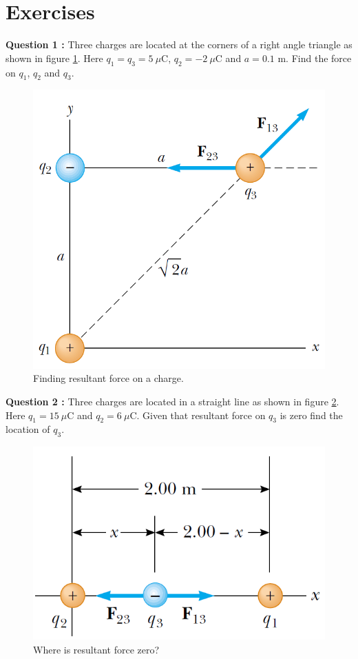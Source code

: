 \documentclass[12pt,a4paper]{article}
\begin{document}
\section{Exercises}
\noindent\textbf{Question 1 \cite[Example 23.2, page 713]{Serway}:} Three charges are located at the corners of a right angle triangle as shown in figure \ref{Resultant-force}. Here $q_1=q_3=5~\mu$C, $q_2=-2~\mu$C and $a=0.1$ m. Find the force on $q_1$, $q_2$ and $q_3$.
\begin{figure}[H]
\centering
\includegraphics[scale=0.5]{Figure23-8.png}
\caption{Finding resultant force on a charge.}
\label{Resultant-force}
\end{figure}
\noindent\textbf{Question 2 \cite[Example 23.3, page 714]{Serway}:} Three charges are located in a straight line as shown in figure \ref{Zero-force}. Here $q_1=15~\mu$C and $q_2=6~\mu$C. Given that resultant force on $q_3$ is zero find the location of $q_3$.
\begin{figure}[H]
\centering
\includegraphics[scale=0.6]{Figure23-9.png}
\caption{Where is resultant force zero?}
\label{Zero-force}
\end{figure}


\end{document}
